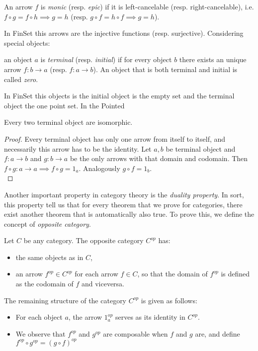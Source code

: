 \begin{definition} An arrow $f$ is  \emph{monic} (resp. \emph{epic}) if it is left-cancelable (resp. right-cancelable), i.e.  $f\circ g = f \circ h \implies g = h$ (resp. $g\circ f = h \circ f \implies g = h$).
\end{definition}


 
In FinSet this arrows are the injective functions (resp. surjective). Considering special objects:

\begin{definition}
  an object $a$ is \emph{terminal} (resp. \emph{initial}) if for every object $b$ there exists an unique arrow $f:b\to a$ (resp. $f:a\to b$).  An object that is both terminal and initial is called \emph{zero}.
\end{definition}

  In FinSet this objects is the initial object is the  empty set and the terminal object the one point set. In the Pointed 

\begin{proposition}\label{terminal-proposition}
  Every two terminal object are isomorphic.
\end{proposition}
\begin{proof}
 Every terminal object has only one arrow from itself to itself, and necessarily this arrow has to be the identity. Let $a, b$ be terminal object and $f:a\to b$ and $g:b\to a$ be the only arrows with that domain and codomain. Then $f\circ g : a \to a \implies f \circ g = 1_a$. Analogously $g \circ f = 1_b$.\\
\end{proof}

Another important property in category theory is the \emph{duality property}. In sort, this property tell us that for every theorem that we prove for categories, there exist another theorem that is automatically also true. To prove this, we define the concept of \emph{opposite category}.


\begin{definition}
  Let $C$ be any category. The opposite category $C^{op}$ has:
  \begin{itemize}
  \item the same objects as in $C$,
  \item an arrow $f^{op}\in C^{op}$ for each arrow $f \in C$, so that the domain of $f^{op}$ is defined as the codomain of $f$ and viceversa.
  \end{itemize}
  The remaining structure of the category $C^{op}$ is given as follows:
  \begin{itemize}
  \item For each object $a$, the arrow $1_a^{op}$ serves as its identity in $C^{op}$.
  \item We observe that $f^{op}$ and $g^{op}$ are composable when $f$ and $g$ are, and define $f^{op} \circ g^{op} = (g \circ f)^{op}$
  \end{itemize}
\end{definition}


